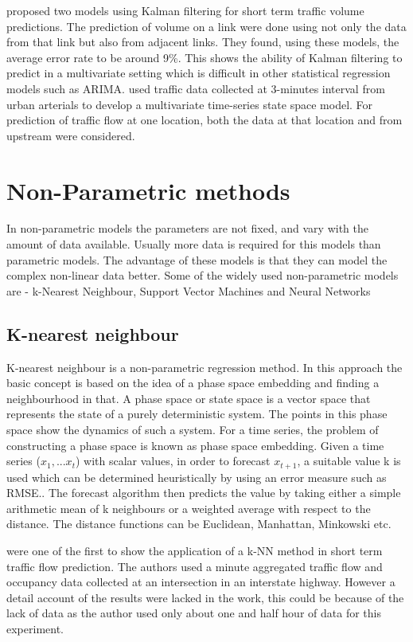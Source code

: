 \citet{okutani1984dynamic} proposed two models using Kalman filtering for short term traffic volume
predictions. The prediction of volume on a link were done using not only the data from that link but
also from adjacent links. They found, using these models, the average error rate to be around 9\%.
This shows the ability of Kalman filtering to predict in a multivariate setting which is difficult in
other statistical regression models such as ARIMA. \citet{stathopoulos2003multivariate} used traffic
data collected at 3-minutes interval from urban arterials to develop a multivariate time-series
state space model. For prediction of traffic flow at one location, both the data at that location
and from upstream were considered.

\section{Non-Parametric methods}
In non-parametric models the parameters are not fixed, and vary with the amount of data available.
Usually more data is required for this models than parametric models. The advantage of these models
is that they can model the complex non-linear data better. Some of the widely used non-parametric
models are - k-Nearest Neighbour, Support Vector Machines and Neural Networks

\subsection{K-nearest neighbour}
K-nearest neighbour is a non-parametric regression method. In this approach the basic concept is based
on the idea of a phase space embedding and finding a neighbourhood in that. A phase space or state
space is a vector space that represents the state of a purely deterministic system. The points in this
phase space show the dynamics of such a system. For a time series, the problem of constructing a phase
space is known as phase space embedding. Given a time series ($x_{1},...x_{t}$) with scalar values,
in order to forecast $x_{t+1}$, a suitable value k is used which can be determined heuristically by
using an error measure such as RMSE.. The forecast algorithm then predicts the value by taking either
a simple arithmetic mean of k neighbours or a weighted average with respect to the distance. The
distance functions can be Euclidean, Manhattan, Minkowski etc.

\citet{davis1991nonparametric} were one of the first to show the application of a k-NN method in short
term traffic flow prediction. The authors used a minute aggregated traffic flow and occupancy data
collected at an intersection in an interstate highway. However a detail account of the results were
lacked in the work, this could be because of the lack of data as the author used only about one and
half hour of data for this experiment.

